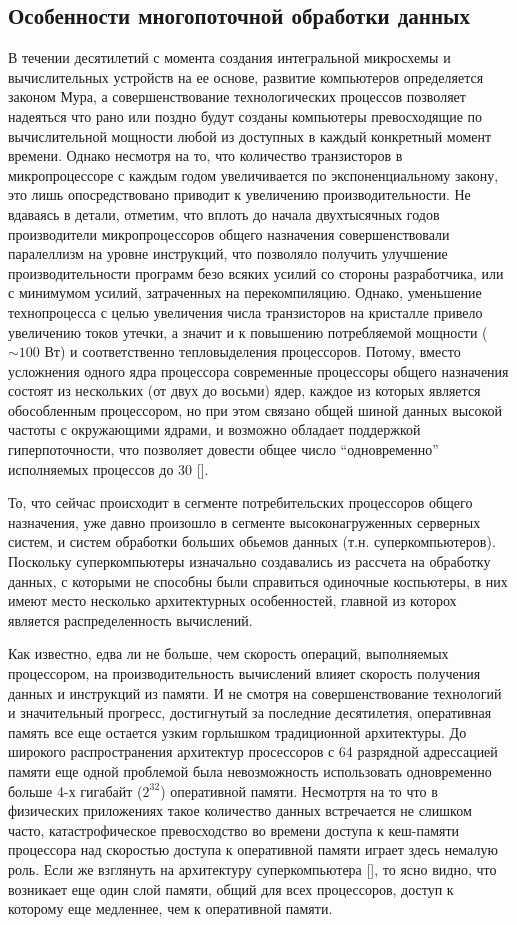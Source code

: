     \subsection{Особенности многопоточной обработки данных} %
    \label{sub:MultithreadMulticoreDataProcessing}
        В течении десятилетий с момента создания интегральной микросхемы и вычислительных устройств на ее основе, развитие компьютеров определяется законом Мура, а совершенствование технологических процессов позволяет надеяться что рано или поздно будут созданы компьютеры превосходящие по вычислительной мощности любой из доступных в каждый конкретный момент времени. Однако несмотря на то, что количество транзисторов в микропроцессоре с каждым годом увеличивается по экспоненциальному закону, это лишь опосредствовано приводит к увеличению производительности. Не вдаваясь в детали, отметим, что вплоть до начала двухтысячных годов производители микропроцессоров общего назначения совершенствовали паралеллизм на уровне инструкций, что позволяло получить улучшение производительности программ безо всяких усилий со стороны разработчика, или с минимумом усилий, затраченных на перекомпиляцию. Однако, уменьшение технопроцесса с целью увеличения числа транзисторов на кристалле привело увеличению токов утечки, а значит и к повышению потребляемой мощности ($\sim 100$ Вт) и соответственно тепловыделения процессоров. Потому, вместо усложнения одного ядра процессора современные процессоры общего назначения состоят из нескольких (от двух до восьми) ядер, каждое из которых является обособленным процессором, но при этом связано общей шиной данных высокой частоты с окружающими ядрами, и возможно обладает поддержкой гиперпоточности, что позволяет довести общее число ``одновременно'' исполняемых процессов до 30 [].

        То, что сейчас происходит в сегменте потребительских процессоров общего назначения, уже давно произошло в сегменте высоконагруженных серверных систем, и систем обработки больших обьемов данных (т.н. суперкомпьютеров). Поскольку суперкомпьютеры изначально создавались из рассчета на обработку данных, с которыми не способны были справиться одиночные коспьютеры, в них имеют место несколько архитектурных особенностей, главной из которох является распределенность вычислений.

        Как известно, едва ли не больше, чем скорость операций, выполняемых процессором, на производительность вычислений влияет скорость получения данных и инструкций из памяти. И не смотря на совершенствование технологий и значительный прогресс, достигнутый за последние десятилетия, оперативная память все еще остается узким горлышком традиционной архитектуры. До широкого распространения архитектур просессоров с 64 разрядной адрессацией памяти еще одной проблемой была невозможность использовать одновременно больше 4-х гигабайт ($2^{32}$) оперативной памяти. Несмотртя на то что в физических приложениях такое количество данных встречается не слишком часто, катастрофическое превосходство во времени доступа к кеш-памяти процессора над скоростью доступа к оперативной памяти играет здесь немалую роль. Если же взглянуть на архитектуру суперкомпьютера [], то ясно видно, что возникает еще один слой памяти, общий для всех процессоров, доступ к которому еще медленнее, чем к оперативной памяти.

